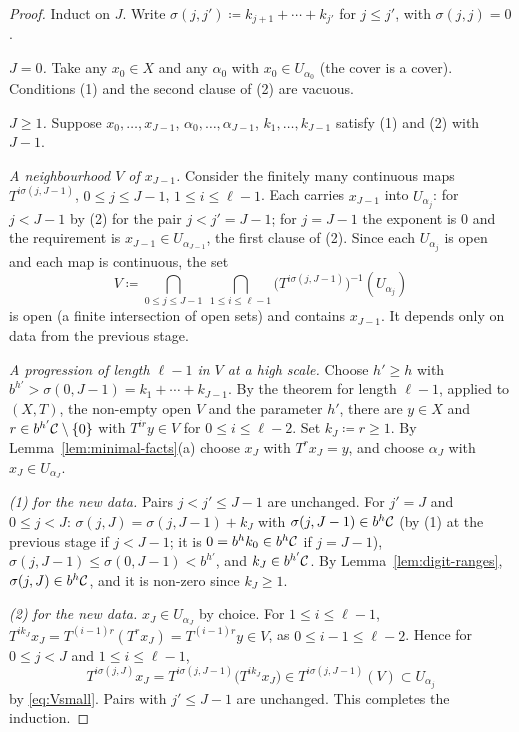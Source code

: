 \begin{proof}
  Induct on $J$.  Write $\sigma(j,j') \coloneqq k_{j+1} + \cdots + k_{j'}$ for $j \leq j'$, with
  $\sigma(j,j) = 0$.

  \emph{$J = 0$.}  Take any $x_0 \in X$ and any $\alpha_0$ with $x_0 \in U_{\alpha_0}$ (the
  cover is a cover).  Conditions (1) and the second clause of (2) are vacuous.

  \emph{$J \geq 1$.}  Suppose $x_0,\dots,x_{J-1}$, $\alpha_0,\dots,\alpha_{J-1}$,
  $k_1,\dots,k_{J-1}$ satisfy (1) and (2) with $J - 1$.

  \emph{A neighbourhood $V$ of $x_{J-1}$.}  Consider the finitely many continuous maps
  $T^{i\sigma(j,J-1)}$, $0 \leq j \leq J-1$, $1 \leq i \leq \ell-1$.  Each carries $x_{J-1}$
  into $U_{\alpha_j}$: for $j < J-1$ by (2) for the pair $j < j' = J-1$; for $j = J-1$ the
  exponent is $0$ and the requirement is $x_{J-1} \in U_{\alpha_{J-1}}$, the first clause of
  (2).  Since each $U_{\alpha_j}$ is open and each map is continuous, the set
  \begin{equation}
    \label{eq:Vsmall}
    V \coloneqq \bigcap_{0 \leq j \leq J-1} \ \bigcap_{1 \leq i \leq \ell-1} \bigl(T^{i\sigma(j,J-1)}\bigr)^{-1}(U_{\alpha_j})
  \end{equation}
  is open (a finite intersection of open sets) and contains $x_{J-1}$.  It depends only on data
  from the previous stage.

  \emph{A progression of length $\ell - 1$ in $V$ at a high scale.}  Choose $h' \geq h$ with
  $b^{h'} > \sigma(0,J-1) = k_1 + \cdots + k_{J-1}$.  By the theorem for length $\ell - 1$,
  applied to $(X,T)$, the non-empty open $V$ and the parameter $h'$, there are $y \in X$ and
  $r \in b^{h'}\mathcal{C}\setminus\{0\}$ with $T^{ir}y \in V$ for $0 \leq i \leq \ell - 2$.  Set
  $k_J \coloneqq r \geq 1$.  By Lemma~\ref{lem:minimal-facts}(a) choose $x_J$ with $T^rx_J = y$,
  and choose $\alpha_J$ with $x_J \in U_{\alpha_J}$.

  \emph{(1) for the new data.}  Pairs $j < j' \leq J-1$ are unchanged.  For $j' = J$ and
  $0 \leq j < J$: $\sigma(j,J) = \sigma(j,J-1) + k_J$ with $\sigma(j,J-1) \in b^h\mathcal{C}$
  (by (1) at the previous stage if $j < J-1$; it is $0 = b^h k_0 \in b^h\mathcal{C}$ if $j = J-1$),
  $\sigma(j,J-1) \leq \sigma(0,J-1) < b^{h'}$, and $k_J \in b^{h'}\mathcal{C}$.  By
  Lemma~\ref{lem:digit-ranges}, $\sigma(j,J) \in b^h\mathcal{C}$, and it is non-zero since
  $k_J \geq 1$.

  \emph{(2) for the new data.}  $x_J \in U_{\alpha_J}$ by choice.  For $1 \leq i \leq \ell - 1$,
  $T^{ik_J}x_J = T^{(i-1)r}(T^rx_J) = T^{(i-1)r}y \in V$, as $0 \leq i - 1 \leq \ell - 2$.  Hence
  for $0 \leq j < J$ and $1 \leq i \leq \ell-1$,
  \[
    T^{i\sigma(j,J)}x_J = T^{i\sigma(j,J-1)}\bigl(T^{ik_J}x_J\bigr) \in T^{i\sigma(j,J-1)}(V) \subset U_{\alpha_j}
  \]
  by \eqref{eq:Vsmall}.  Pairs with $j' \leq J-1$ are unchanged.  This completes the induction.
\end{proof}

